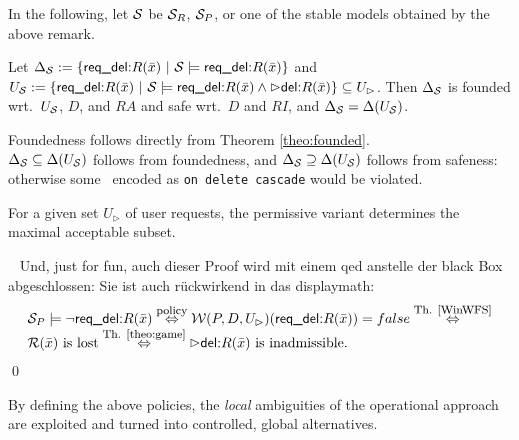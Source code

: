 \documentclass[twoside,11pt]{article}
\theoremstyle{lines}
\theoremstyle{longplain}
\def\rdel{\itorsf{req\_del:}}
\begin{document}
\noindent
In the following, let $\mathcal S$ be $\mathcal S_R$, $\mathcal S_P$, or one of the
stable models obtained by the above remark.

\begin{Theorem}[Correctness]\label{theo:Correctness}
Let
$\Delta_{\pl S} := 
  \{\rdel R(\bar x) \st \pl S \models \rdel R(\bar x)\}$
and 
$U_\pl S:= \{\rdel R(\bar x) \st 
   \pl S \models \rdel R(\bar x) \land \extev \del R(\bar x)\}
  \subseteq U_\rhd$.
%
Then $\Delta_{\mathcal S}$ is founded wrt.\ $U_\mathcal S$, $D$, and $RA$ and
safe wrt.\ $D$ and $RI$, and $\Delta_{\mathcal S} = \Delta(U_\mathcal S)$.
\end{Theorem}
\begin{Proof}
Foundedness follows directly from Theorem \ref{theo:founded}. \\
$\Delta_{\mathcal S} \subseteq \Delta(U_\mathcal S)$ follows from foundedness,
and $\Delta_{\mathcal S} \supseteq \Delta(U_\mathcal S)$ follows from safeness:
otherwise some \ric\ encoded as \texttt{on delete cascade} would be
violated.
\end{Proof}

\begin{Theorem}[Maximality]
  For a given set $U_\rhd$ of user requests, the permissive variant
  determines the maximal acceptable subset.
\end{Theorem}
\begin{Proof}~
Und, just for fun, auch dieser Proof wird mit einem qed anstelle der
black Box abgeschlossen: Sie ist auch r\"uckwirkend in das displaymath:
\[\begin{array}[t]{l}
  \pl S_P \models \neg \rdel R(\bar x) 
  \stackrel{\mbox{\footnotesize policy}}{\Iff}
  \pl W(P,D,U_\rhd)(\rdel R(\bar x)) = false
  \stackrel{\mbox{\footnotesize Th. \ref{WinWFS}}}{\Iff} \\
  \pl R(\bar x) \mbox{ is lost}
  \stackrel{\mbox{\footnotesize Th. \ref{theo:game}}}{\Iff} 
  \extev \del R(\bar x) \mbox{ is inadmissible.}
 \end{array} \]
\qed
\end{Proof}

\noindent
By defining the above policies, the \emph{local} ambiguities of
the operational approach are exploited and turned into controlled, global
alternatives.
\end{document}
